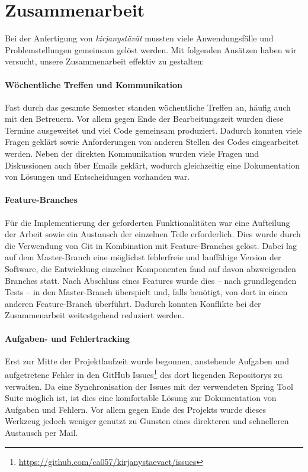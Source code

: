 \section{Zusammenarbeit}

	Bei der Anfertigung von \textit{kirjanystävät} mussten viele Anwendungsfälle und Problemstellungen gemeinsam gelöst werden. Mit folgenden Ansätzen haben wir versucht, unsere Zusammenarbeit effektiv zu gestalten:
	
	\paragraph{Wöchentliche Treffen und Kommunikation}
	Fast durch das gesamte Semester standen wöchentliche Treffen an, häufig auch mit den Betreuern. Vor allem gegen Ende der Bearbeitungszeit wurden diese Termine ausgeweitet und viel Code gemeinsam produziert. Dadurch konnten viele Fragen geklärt sowie Anforderungen von anderen Stellen des Codes eingearbeitet werden. Neben der direkten Kommunikation wurden viele Fragen und Diskussionen auch über Emails geklärt, wodurch gleichzeitig eine Dokumentation von Lösungen und Entscheidungen vorhanden war.
	
	\paragraph{Feature-Branches}
	Für die Implementierung der geforderten Funktionalitäten war eine Aufteilung der Arbeit sowie ein Austausch der einzelnen Teile erforderlich. Dies wurde durch die Verwendung von Git in Kombination mit Feature-Branches gelöst. Dabei lag auf dem Master-Branch eine möglichst fehlerfreie und lauffähige Version der Software, die Entwicklung einzelner Komponenten fand auf davon abzweigenden Branches statt. Nach Abschluss eines Features wurde dies -- nach grundlegenden Tests -- in den Master-Branch überspielt und, falls benötigt, von dort in einen anderen Feature-Branch überführt. Dadurch konnten Konflikte bei der Zusammenarbeit weitestgehend reduziert werden.
	
	\paragraph{Aufgaben- und Fehlertracking}
	Erst zur Mitte der Projektlaufzeit wurde begonnen, anstehende Aufgaben und aufgetretene Fehler in den GitHub Issues\footnote{\hyperlink{https://github.com/ca057/kirjanystaevaet/issues}{https://github.com/ca057/kirjanystaevaet/issues}} des dort liegenden Repositorys zu verwalten. Da eine Synchronisation der Issues mit der verwendeten Spring Tool Suite möglich ist, ist dies eine komfortable Lösung zur Dokumentation von Aufgaben und Fehlern. Vor allem gegen Ende des Projekts wurde dieses Werkzeug jedoch weniger genutzt zu Gunsten eines direkteren und schnelleren Austausch per Mail.